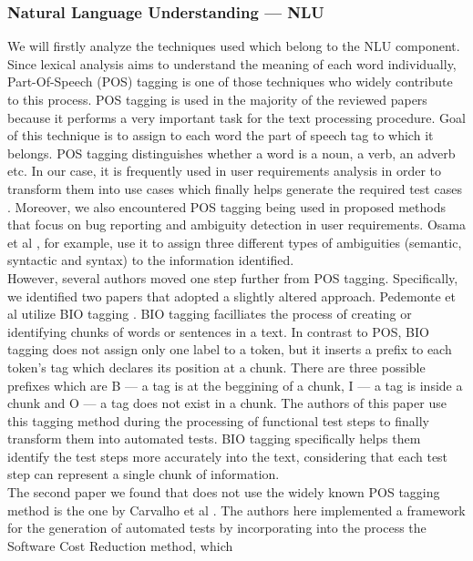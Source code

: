 \subsubsection* {Natural Language Understanding --- NLU}
We will firstly analyze the techniques used which belong to the NLU component.
Since lexical analysis aims to understand the meaning of each word individually, Part-Of-Speech (POS) tagging is one of those techniques who widely 
contribute to this process. POS tagging is used in the majority of the reviewed papers because it performs a very important task for the text processing 
procedure. Goal of this technique is to assign to each word the part of speech tag to which it belongs. POS tagging distinguishes whether a word is 
a noun, a verb, an adverb etc. In our case, it is frequently used in user requirements analysis in order to transform them into use cases which finally 
helps generate the required test cases \cite{allala2019towards, wang2020automatic, rane2017automatic, 8812070, preeti2017building, mulla2020potent}. 
Moreover, we also encountered POS tagging being used in proposed methods that focus on bug reporting and ambiguity detection in user requirements. 
Osama et al \cite{9240680}, for example, use it to assign three different types of ambiguities (semantic, syntactic and syntax) to the information identified. \\
However, several authors moved one step further from POS tagging. Specifically, we identified two papers that adopted a slightly altered approach. 
Pedemonte et al \cite{pedemonte2012towards} utilize BIO tagging \cite{ramshaw1999text}. BIO tagging facilliates the process of creating or identifying chunks of words or sentences in a text. 
In contrast to POS, BIO tagging does not assign only one label to a token, but it inserts a prefix to each token's tag which declares its position 
at a chunk. There are three possible prefixes which are B --- a tag is at the beggining of a chunk, I --- a tag is inside a chunk and O --- 
a tag does not exist in a chunk. The authors of this paper use this tagging method during the processing of functional test steps to finally transform them into 
automated tests. BIO tagging specifically helps them identify the test steps more accurately into the text, considering that each test step can 
represent a single chunk of information.\\
The second paper we found that does not use the widely known POS tagging method is the one by Carvalho et al \cite{carvalho2014nat2testscr}. The 
authors here implemented a framework for the generation of automated tests by incorporating into the process the Software Cost Reduction method, which 
